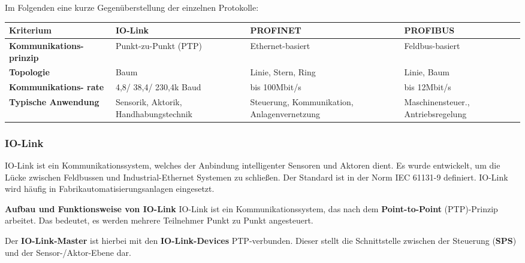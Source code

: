 Im Folgenden eine kurze Gegenüberstellung der einzelnen Protokolle:


\begin{center}

    \begin{tabular}{|p{4cm}|p{3.5cm}|p{3.5cm}|p{3.5cm}|}
        \hline
            \textbf{Kriterium} & \textbf{IO-Link} &\textbf{PROFINET} &\textbf{PROFIBUS}\\
            \hline
            \textbf{Kommunikations- prinzip} & Punkt-zu-Punkt (PTP) & Ethernet-basiert& Feldbus-basiert \\
            \hline
            \textbf{Topologie}& Baum & Linie, Stern, Ring & Linie, Baum\\
            \hline
            \textbf{Kommunikations- rate} &4,8/ 38,4/ 230,4k Baud & bis 100Mbit/s & bis 12Mbit/s\\
            \hline
            \textbf{Typische Anwendung} & Sensorik, Aktorik, Handhabungstechnik & Steuerung, Kommunikation, Anlagenvernetzung& Maschinensteuer., Antriebsregelung\\
            \hline
    \end{tabular}

    \label{tab:vergleichIOlinkprofinetprofibus}
\end{center}

\subsubsection{IO-Link}
IO-Link ist ein Kommunikationssystem, welches der Anbindung intelligenter Sensoren
und Aktoren dient.
Es wurde entwickelt, um die Lücke zwischen Feldbussen und Industrial-Ethernet
Systemen zu schließen. Der Standard ist in der Norm IEC 61131-9 definiert. IO-Link
wird häufig in Fabrikautomatisierungsanlagen eingesetzt.

\textbf{Aufbau und Funktionsweise von IO-Link}
IO-Link ist ein Kommunikationssystem, das nach dem \textbf{Point-to-Point} (PTP)-Prinzip
arbeitet. Das bedeutet, es werden mehrere Teilnehmer Punkt zu Punkt angesteuert.

Der \textbf{IO-Link-Master} ist hierbei mit den \textbf{IO-Link-Devices} PTP-verbunden. Dieser stellt
die Schnittstelle zwischen der Steuerung (\textbf{SPS}) und der Sensor-/Aktor-Ebene dar.


